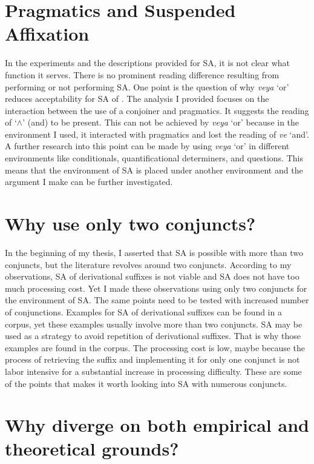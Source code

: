 \section{Pragmatics and Suspended Affixation}

In the experiments and the descriptions provided for SA, it is not clear what function it serves. There is no prominent reading difference resulting from performing or not performing SA. One point is the question of why \textit{veya} `or' reduces acceptability for SA of {\Acc}. The analysis I provided focuses on the interaction between the use of a conjoiner and pragmatics. It suggests the reading of `$\wedge$' (and) to be present. This can not be achieved by \textit{veya} `or' because in the environment I used, it interacted with pragmatics and lost the reading of \textit{ve} `and'. A further research into this point can be made by using \textit{veya} `or' in different environments like conditionals, quantificational determiners, and questions. This means that the environment of SA is placed under another environment and the argument I make can be further investigated.


\section{Why use only two conjuncts?}

In the beginning of my thesis, I asserted that SA is possible with more than two conjuncts, but the literature revolves around two conjuncts. According to my observations, SA of derivational suffixes is not viable and SA does not have too much processing cost. Yet I made these observations using only two conjuncts for the environment of SA. The same points need to be tested with increased number of conjunctions. Examples for SA of derivational suffixes can be found in a corpus, yet these examples usually involve more than two conjuncts. SA may be used as a strategy to avoid repetition of derivational suffixes. That is why those examples are found in the corpus. The processing cost is low, maybe because the process of retrieving the suffix and implementing it for only one conjunct is not labor intensive for a substantial increase in processing difficulty. These are some of the points that makes it worth looking into SA with numerous conjuncts.


\section{Why diverge on both empirical and theoretical grounds?}

